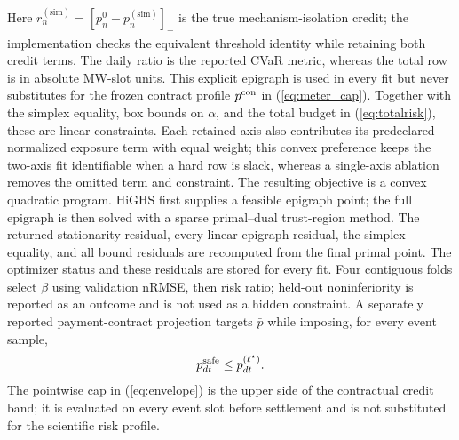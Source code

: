 \documentclass[10pt,journal]{IEEEtran}
\begin{document}
Here $r^{(\mathrm{sim})}_n=[p^0_n-p^{(\mathrm{sim})}_n]_+$ is the true
mechanism-isolation credit; the implementation checks the equivalent threshold
identity while retaining both credit terms. The daily ratio is the reported
CVaR metric, whereas the total row is in absolute MW-slot units. This explicit
epigraph is used in every fit but never substitutes for the frozen contract
profile $p^{\rm con}$ in (\ref{eq:meter_cap}). Together with the simplex
equality, box bounds on $\alpha$, and the total budget in
(\ref{eq:totalrisk}), these are linear constraints. Each retained axis also
contributes its predeclared normalized exposure term with equal weight; this
convex preference keeps the two-axis fit identifiable when a hard row is slack,
whereas a single-axis ablation removes the omitted term and constraint.
The resulting objective is a convex quadratic program. HiGHS first supplies a feasible
epigraph point; the full epigraph is then solved with a sparse primal--dual
trust-region method. The returned stationarity residual, every linear
epigraph residual, the simplex equality, and all bound residuals are recomputed
from the final primal point. The optimizer status and these residuals are stored
for every fit. Four
contiguous folds select $\beta$
using validation nRMSE, then risk ratio; held-out noninferiority is reported
as an outcome and is not used as a hidden constraint. A separately reported payment-contract projection targets $\bar p$ while
imposing, for every event sample,
\begin{equation}
p^{\rm safe}_{dt}\leq p^{(\ell^\star)}_{dt}. \label{eq:envelope}
\end{equation}
The pointwise cap in (\ref{eq:envelope}) is the upper side of the contractual
credit band; it is evaluated on every event slot before settlement and is not
substituted for the scientific risk profile.
\end{document}
